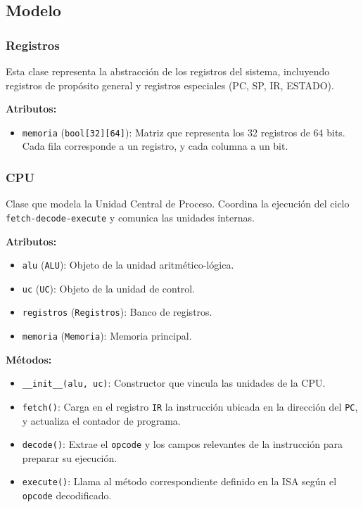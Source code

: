 \documentclass{article}
\begin{document}
\subsection{Modelo}

\subsubsection*{Registros}

Esta clase representa la abstracción de los registros del sistema, incluyendo registros de 
propósito general y registros especiales (PC, SP, IR, ESTADO).

\textbf{Atributos:}
\begin{itemize}
  \item \texttt{memoria} (\texttt{bool[32][64]}): Matriz que representa los 32 registros 
  de 64 bits. Cada fila corresponde a un registro, y cada columna a un bit.
\end{itemize}

\subsubsection*{CPU}

Clase que modela la Unidad Central de Proceso. Coordina la ejecución del ciclo 
\texttt{fetch-decode-execute} y comunica las unidades internas.

\textbf{Atributos:}
\begin{itemize}
  \item \texttt{alu} (\texttt{ALU}): Objeto de la unidad aritmético-lógica.
  \item \texttt{uc} (\texttt{UC}): Objeto de la unidad de control.
  \item \texttt{registros} (\texttt{Registros}): Banco de registros.
  \item \texttt{memoria} (\texttt{Memoria}): Memoria principal.
\end{itemize}

\textbf{Métodos:}
\begin{itemize}
  \item \texttt{\_\_init\_\_(alu, uc)}: Constructor que vincula las unidades de la CPU.
  \item \texttt{fetch()}: Carga en el registro \texttt{IR} la instrucción ubicada en la
      dirección del \texttt{PC}, y actualiza el contador de programa.
  \item \texttt{decode()}: Extrae el \texttt{opcode} y los campos relevantes de 
        la instrucción para preparar su ejecución.
  \item \texttt{execute()}: Llama al método correspondiente definido en la ISA 
        según el \texttt{opcode} decodificado.
\end{itemize}
\end{document}
